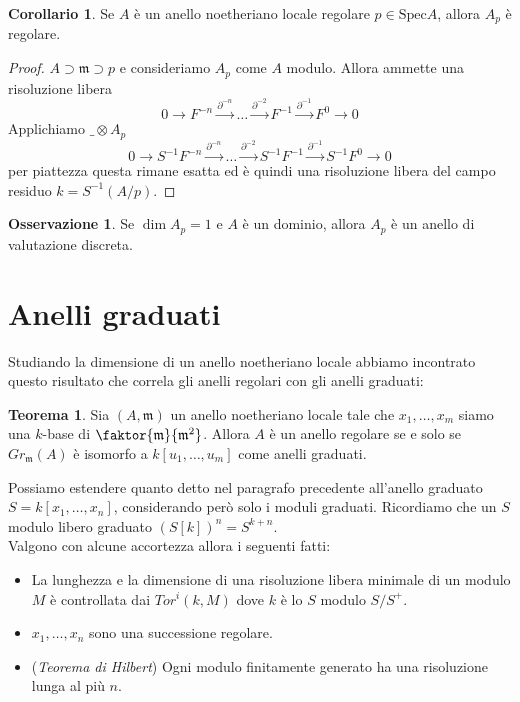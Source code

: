 \documentclass[a4paper,11pt,oneside]{book}
\newcommand{\Spec}{\mathrm{Spec}}
\newcommand{\inverti}[1]{{#1}^{-1}}
\newcommand{\m}{\mathfrak{m}}
\theoremstyle{definition}
\newtheorem{teo}[section]{Teorema}
\newtheorem{cor}{Corollario}
\newtheorem{oss}[section]{Osservazione}
\begin{document}
     

     \begin{cor}
      Se $A$ è un anello noetheriano locale regolare $p\in\Spec A$, allora $A_p$ è regolare.
     \end{cor}
     \begin{proof}
      $A\supset \m\supset p$ e consideriamo $A_p$ come $A$ modulo. Allora ammette una risoluzione libera  
      \[
	  0\rightarrow F^{-n}\xrightarrow{\partial^{-n}}\dots\xrightarrow{\partial^{-2}} F^{-1}\xrightarrow{\partial^{-1}}F^0\rightarrow 0
      \]
      Applichiamo $\_\otimes A_p $
      \[
	  0\rightarrow \inverti S F^{-n}\xrightarrow{\partial^{-n}}\dots\xrightarrow{\partial^{-2}}\inverti S F^{-1}\xrightarrow{\partial^{-1}}\inverti S F^0\rightarrow 0
      \]
      per piattezza questa rimane esatta ed è quindi una risoluzione libera del campo residuo $k=\inverti{S}(A/p)$.
     \end{proof}

      
     \begin{oss}
      Se $\dim A_p=1$ e $A$ è un dominio, allora $A_p$ è un anello di valutazione discreta.
     \end{oss}

     
     \section{Anelli graduati}
     Studiando la dimensione di un anello noetheriano locale abbiamo incontrato questo risultato che correla gli anelli regolari 
     con gli anelli graduati:
     
     \begin{teo}
      Sia $(A,\m)$ un anello noetheriano locale tale che $x_1,\dots, x_{m}$ siamo una $k$-base di $\faktor{\m}{\m^2}$.
      Allora $A$ è un anello regolare se e solo se $Gr_{\m}(A)$ è isomorfo a $k[u_1,\dots, u_{m}]$ come anelli graduati.
     \end{teo}

     Possiamo estendere quanto detto nel paragrafo precedente all'anello graduato $S=k[x_1,\dots, x_{n}]$, considerando 
     però solo i moduli graduati. Ricordiamo che un $S$ modulo libero graduato $(S[k])^n=S^{k+n}$.\\
     Valgono con alcune accortezza allora i seguenti fatti:
     \begin{itemize}
      \item La lunghezza e la dimensione di una risoluzione libera minimale di un modulo $M$ è controllata dai $Tor^i(k,M)$
	    dove $k$ è lo $S$ modulo $S/S^+$.
      \item $x_1,\dots, x_{n}$ sono una successione regolare.
      \item (\emph{Teorema di Hilbert}) Ogni modulo finitamente generato  ha una risoluzione lunga al più $n$.
     \end{itemize}
\end{document}
